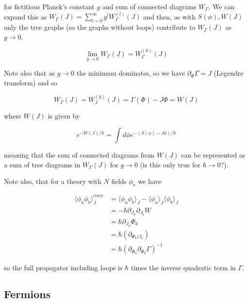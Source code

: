 \documentclass{article}
\theoremstyle{definition}
\begin{document}
for fictitious Planck's constant $g$ and sum of connected diagrams $W_\Gamma$.
We can expand this as $W_\Gamma(J) = \sum_{l = 0}^\infty g^l W_\Gamma^{(l)} (J)$
and then, as with $S(\phi), W(J)$ only the tree graphs (so the graphs without
loops) contribute to $W_\Gamma(J)$ as $g \to 0$.

\begin{equation}
  \lim_{g \to 0} W_\Gamma (J) = W_\Gamma^{(0)}(J)
\end{equation}

Note also that as $g \to 0$ the minimum dominates, so we have $\partial_\Phi
\Gamma = J$ (Legendre transform) and so

\begin{equation}
  W_\Gamma(J) = W_J^{(0)}(J) = \Gamma(\Phi) - J\Phi = W(J)
\end{equation}

where $W(J)$ is given by

\begin{equation}
  e^{-W(J) / \hbar} = \int d\phi e^{-(S(\phi) - J\phi) / \hbar}
\end{equation}

meaning that the sum of connected diagrams from $W(J)$ can be represented as a
sum of tree diagrams in $W_\Gamma(J)$ for $g \to 0$ (is this only true for
$\hbar \to 0$?).

Note also, that for a theory with $N$ fields $\phi_a$ we have

\begin{align*}
  \langle \phi_a \phi_b \rangle_J^{conn}
  &= \langle \phi_a \phi_b \rangle_J - \langle \phi_a \rangle_J
    \langle \phi_b \rangle_J \\
  &= -\hbar \partial_{J_a} \partial_{J_b} W \\
  &= \hbar \partial_{J_a} \Phi_b \\
  &= \hbar \left( \partial_{\Phi_b) J_a} \right) \\
  &= \hbar (\partial_{\Phi_a} \partial_{\Phi_b} \Gamma)^{-1}
\end{align*}

so the full propagator including loops is $\hbar$ times the inverse quadratic
term in $\Gamma$.

\subsection{Fermions}
\end{document}
